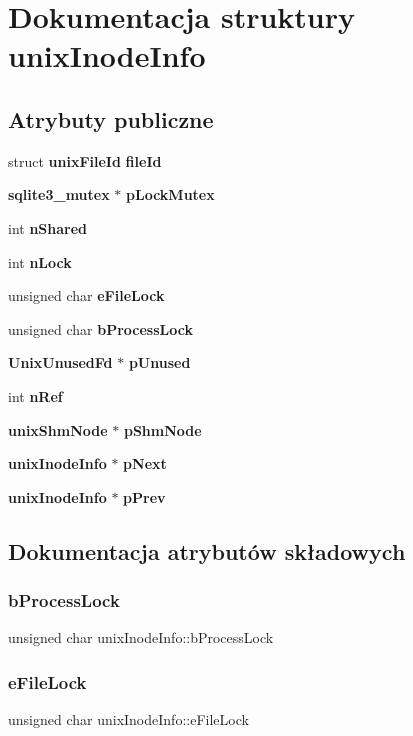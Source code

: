 \section{Dokumentacja struktury unix\+Inode\+Info}
\label{structunix_inode_info}
\subsection*{Atrybuty publiczne}
\begin{DoxyCompactItemize}
\item 
struct \textbf{ unix\+File\+Id} \textbf{ file\+Id}
\item 
\textbf{ sqlite3\+\_\+mutex} $\ast$ \textbf{ p\+Lock\+Mutex}
\item 
int \textbf{ n\+Shared}
\item 
int \textbf{ n\+Lock}
\item 
unsigned char \textbf{ e\+File\+Lock}
\item 
unsigned char \textbf{ b\+Process\+Lock}
\item 
\textbf{ Unix\+Unused\+Fd} $\ast$ \textbf{ p\+Unused}
\item 
int \textbf{ n\+Ref}
\item 
\textbf{ unix\+Shm\+Node} $\ast$ \textbf{ p\+Shm\+Node}
\item 
\textbf{ unix\+Inode\+Info} $\ast$ \textbf{ p\+Next}
\item 
\textbf{ unix\+Inode\+Info} $\ast$ \textbf{ p\+Prev}
\end{DoxyCompactItemize}


\subsection{Dokumentacja atrybutów składowych}
\mbox{\label{structunix_inode_info_ade689e4231dd80bb33c86da1e5ed1586}} 
\subsubsection{bProcessLock}
{\footnotesize\ttfamily unsigned char unix\+Inode\+Info\+::b\+Process\+Lock}

\mbox{\label{structunix_inode_info_a010a765bb3feecb16b650f68fc3a3c1f}} 
\subsubsection{eFileLock}
{\footnotesize\ttfamily unsigned char unix\+Inode\+Info\+::e\+File\+Lock}

